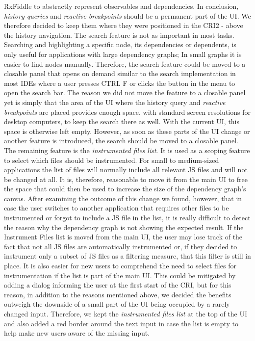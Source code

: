 RxFiddle to abstractly represent observables and dependencies. In conclusion, \emph{history queries} and \emph{reactive breakpoints} should be a permanent part of the UI. We therefore decided to keep them where they were positioned in the CRI2 - above the history navigation.
The search feature is not as important in most tasks. Searching and highlighting a specific node, its dependencies or dependents, is only useful for applications with large dependency graphs; In small graphs it is easier to find nodes manually. Therefore, the search feature could be moved to a closable panel that opens on demand similar to the search implementation in most IDEs where a user presses CTRL F or clicks the button in the menu to open the search bar. The reason we did not move the feature to a closable panel yet is simply that the area of the UI where the history query and \emph{reactive breakpoints} are placed provides enough space, with standard screen resolutions for desktop computers, to keep the search there as well. With the current UI, this space is otherwise left empty. However, as soon as these parts of the UI change or another feature is introduced, the search should be moved to a closable panel. The remaining feature is the \emph{instrumented files list}. It is used as a scoping feature to select which files should be instrumented. For small to medium-sized applications the list of files will normally include all relevant JS files and will not be changed at all. It is, therefore, reasonable to move it from the main UI to free the space that could then be used to increase the size of the dependency graph's canvas. After examining the outcome of this change we found, however, that in case the user switches to another application that requires other files to be instrumented or forgot to include a JS file in the list, it is really difficult to detect the reason why the dependency graph is not showing the expected result. If the Instrument Files list is moved from the main UI, the user may lose track of the fact that not all JS files are automatically instrumented or, if they decided to instrument only a subset of JS files as a filtering measure, that this filter is still in place. It is also easier for new users to comprehend the need to select files for instrumentation if the list is part of the main UI. This could be mitigated by adding a dialog informing the user at the first start of the CRI, but for this reason, in addition to the reasons mentioned above, we decided the benefits outweigh the downside of a small part of the UI being occupied by a rarely changed input. Therefore, we kept the \emph{instrumented files list} at the top of the UI and also added a red border around the text input in case the list is empty to help make new users aware of the missing input.

